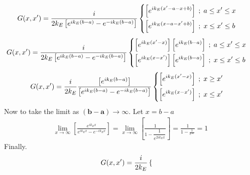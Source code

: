 \documentclass{article}
\begin{document}
{\begin{enumerate}
		\begin{equation*}
			\begin{split}
				G(x,x') = \frac{i}{2k_E \left[ e^{ik_E(b - a)} - e^{-ik_E(b - a)} \right]}
				&\begin{dcases}
					\left[ e^{ik_E(x' - a - x + b)} \right]  \; ; \; a \leq x' \leq x \\
					\left[ e^{ik_E(x - a - x' + b)} \right]  \; ; \; x \leq x' \leq b
				\end{dcases}
			\end{split}
		\end{equation*}
		\begin{equation*}
			\begin{split}
				G(x,x') = \frac{i}{2k_E \left[ e^{ik_E(b - a)} - e^{-ik_E(b - a)} \right]}
				&\begin{dcases}
					\left[ e^{ik_E(x' - x)} \right] \left[ e^{ik_E(b - a)} \right] \; ; \; a \leq x' \leq x \\
					\left[ e^{ik_E(x - x')} \right] \left[ e^{ik_E(b - a)} \right] \; ; \; x \leq x' \leq b
				\end{dcases}
			\end{split}
		\end{equation*}
		\begin{equation*}
			\begin{split}
				G(x,x') = \frac{i}{2k_E}\frac{\left[ e^{ik_E(b - a)} \right]}{\left[ e^{ik_E(b - a)} - e^{-ik_E(b - a)} \right]}
				&\begin{dcases}
					\left[ e^{ik_E(x' - x)} \right] \; ; \; x \geq x' \\
					\left[ e^{ik_E(x - x')} \right] \; ; \; x \leq x'
				\end{dcases}
			\end{split}
		\end{equation*}
		Now to take the limit as $\bm{(b - a) \to \infty}$. Let $x = b-a$
		\begin{equation*}
			\begin{split}
				\lim_{x\to\infty} \left[ \frac{ e^{ik_E x} }{ e^{ik_E x} - e^{-ik_E x} } \right] = \lim_{x\to\infty} \left[ \frac{ 1 }{ 1 - \dfrac{1}{e^{2ik_E x}} } \right] = \frac{1}{1 - \frac{1}{e^{\infty}}} = 1
			\end{split}
		\end{equation*}
		Finally.
		\begin{equation*}
			\begin{split}
				G(x,x') = \frac{i}{2k_E}
				&\begin{dcases}

\end{dcases}
\end{split}
\end{equation*}
\end{enumerate}}
\end{document}
